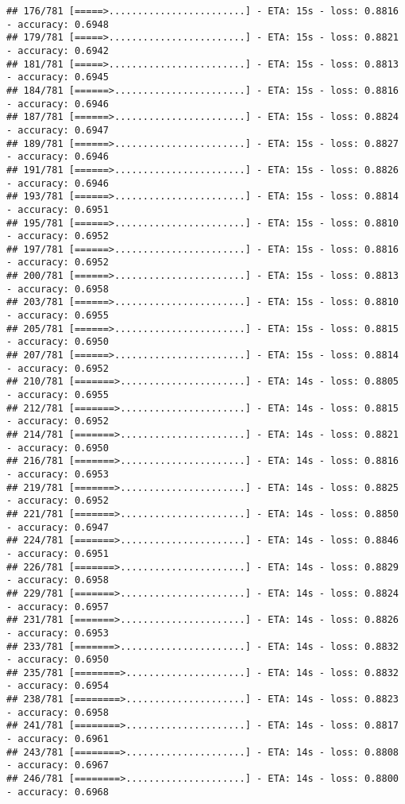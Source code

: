 \documentclass[
]{article}
\begin{document}
\begin{verbatim}
## 176/781 [=====>........................] - ETA: 15s - loss: 0.8816 - accuracy: 0.6948
## 179/781 [=====>........................] - ETA: 15s - loss: 0.8821 - accuracy: 0.6942
## 181/781 [=====>........................] - ETA: 15s - loss: 0.8813 - accuracy: 0.6945
## 184/781 [======>.......................] - ETA: 15s - loss: 0.8816 - accuracy: 0.6946
## 187/781 [======>.......................] - ETA: 15s - loss: 0.8824 - accuracy: 0.6947
## 189/781 [======>.......................] - ETA: 15s - loss: 0.8827 - accuracy: 0.6946
## 191/781 [======>.......................] - ETA: 15s - loss: 0.8826 - accuracy: 0.6946
## 193/781 [======>.......................] - ETA: 15s - loss: 0.8814 - accuracy: 0.6951
## 195/781 [======>.......................] - ETA: 15s - loss: 0.8810 - accuracy: 0.6952
## 197/781 [======>.......................] - ETA: 15s - loss: 0.8816 - accuracy: 0.6952
## 200/781 [======>.......................] - ETA: 15s - loss: 0.8813 - accuracy: 0.6958
## 203/781 [======>.......................] - ETA: 15s - loss: 0.8810 - accuracy: 0.6955
## 205/781 [======>.......................] - ETA: 15s - loss: 0.8815 - accuracy: 0.6950
## 207/781 [======>.......................] - ETA: 15s - loss: 0.8814 - accuracy: 0.6952
## 210/781 [=======>......................] - ETA: 14s - loss: 0.8805 - accuracy: 0.6955
## 212/781 [=======>......................] - ETA: 14s - loss: 0.8815 - accuracy: 0.6952
## 214/781 [=======>......................] - ETA: 14s - loss: 0.8821 - accuracy: 0.6950
## 216/781 [=======>......................] - ETA: 14s - loss: 0.8816 - accuracy: 0.6953
## 219/781 [=======>......................] - ETA: 14s - loss: 0.8825 - accuracy: 0.6952
## 221/781 [=======>......................] - ETA: 14s - loss: 0.8850 - accuracy: 0.6947
## 224/781 [=======>......................] - ETA: 14s - loss: 0.8846 - accuracy: 0.6951
## 226/781 [=======>......................] - ETA: 14s - loss: 0.8829 - accuracy: 0.6958
## 229/781 [=======>......................] - ETA: 14s - loss: 0.8824 - accuracy: 0.6957
## 231/781 [=======>......................] - ETA: 14s - loss: 0.8826 - accuracy: 0.6953
## 233/781 [=======>......................] - ETA: 14s - loss: 0.8832 - accuracy: 0.6950
## 235/781 [========>.....................] - ETA: 14s - loss: 0.8832 - accuracy: 0.6954
## 238/781 [========>.....................] - ETA: 14s - loss: 0.8823 - accuracy: 0.6958
## 241/781 [========>.....................] - ETA: 14s - loss: 0.8817 - accuracy: 0.6961
## 243/781 [========>.....................] - ETA: 14s - loss: 0.8808 - accuracy: 0.6967
## 246/781 [========>.....................] - ETA: 14s - loss: 0.8800 - accuracy: 0.6968

\end{verbatim}
\end{document}
